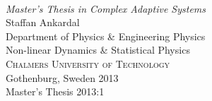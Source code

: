\begin{titlepage}

\mbox{}
\vfill
\addtolength{\voffset}{2cm}
\begin{flushleft}
	{ \\[0.5cm]
	\emph{\Large Master's Thesis in Complex Adaptive Systems} \\[.8cm]
	
	{\huge Staffan Ankardal}\\[.8cm]
	
	{\Large Department of Physics \& Engineering Physics \\
	Non-linear Dynamics \& Statistical Physics \\
	\textsc{Chalmers University of Technology} \\
	Gothenburg, Sweden 2013 \\
	Master's Thesis 2013:1\\
	} 
	}
\end{flushleft}

\end{titlepage}
\ClearShipoutPicture

